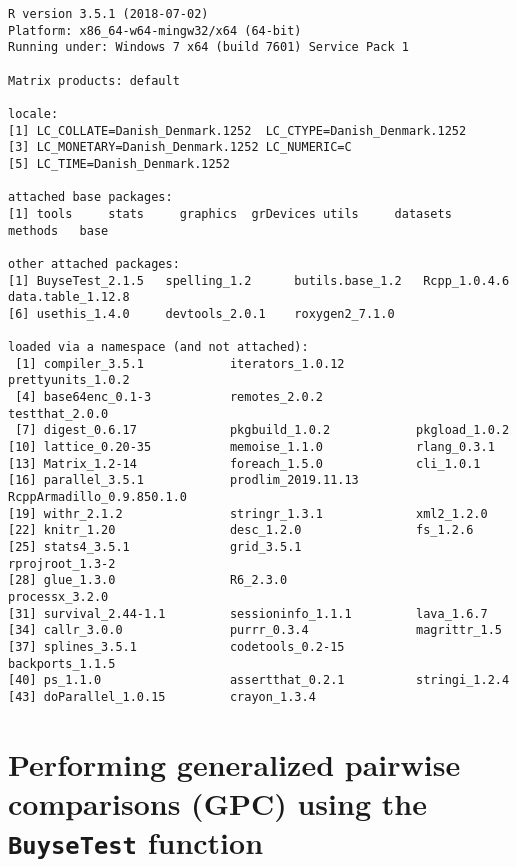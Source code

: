 \documentclass[12pt]{article}
\begin{document}
\begin{verbatim}
R version 3.5.1 (2018-07-02)
Platform: x86_64-w64-mingw32/x64 (64-bit)
Running under: Windows 7 x64 (build 7601) Service Pack 1

Matrix products: default

locale:
[1] LC_COLLATE=Danish_Denmark.1252  LC_CTYPE=Danish_Denmark.1252   
[3] LC_MONETARY=Danish_Denmark.1252 LC_NUMERIC=C                   
[5] LC_TIME=Danish_Denmark.1252    

attached base packages:
[1] tools     stats     graphics  grDevices utils     datasets  methods   base     

other attached packages:
[1] BuyseTest_2.1.5   spelling_1.2      butils.base_1.2   Rcpp_1.0.4.6      data.table_1.12.8
[6] usethis_1.4.0     devtools_2.0.1    roxygen2_7.1.0   

loaded via a namespace (and not attached):
 [1] compiler_3.5.1            iterators_1.0.12          prettyunits_1.0.2        
 [4] base64enc_0.1-3           remotes_2.0.2             testthat_2.0.0           
 [7] digest_0.6.17             pkgbuild_1.0.2            pkgload_1.0.2            
[10] lattice_0.20-35           memoise_1.1.0             rlang_0.3.1              
[13] Matrix_1.2-14             foreach_1.5.0             cli_1.0.1                
[16] parallel_3.5.1            prodlim_2019.11.13        RcppArmadillo_0.9.850.1.0
[19] withr_2.1.2               stringr_1.3.1             xml2_1.2.0               
[22] knitr_1.20                desc_1.2.0                fs_1.2.6                 
[25] stats4_3.5.1              grid_3.5.1                rprojroot_1.3-2          
[28] glue_1.3.0                R6_2.3.0                  processx_3.2.0           
[31] survival_2.44-1.1         sessioninfo_1.1.1         lava_1.6.7               
[34] callr_3.0.0               purrr_0.3.4               magrittr_1.5             
[37] splines_3.5.1             codetools_0.2-15          backports_1.1.5          
[40] ps_1.1.0                  assertthat_0.2.1          stringi_1.2.4            
[43] doParallel_1.0.15         crayon_1.3.4
\end{verbatim}

\clearpage

\section{Performing generalized pairwise comparisons (GPC) using the \texttt{BuyseTest} function}
\label{sec:orge885ae8}
\end{document}
